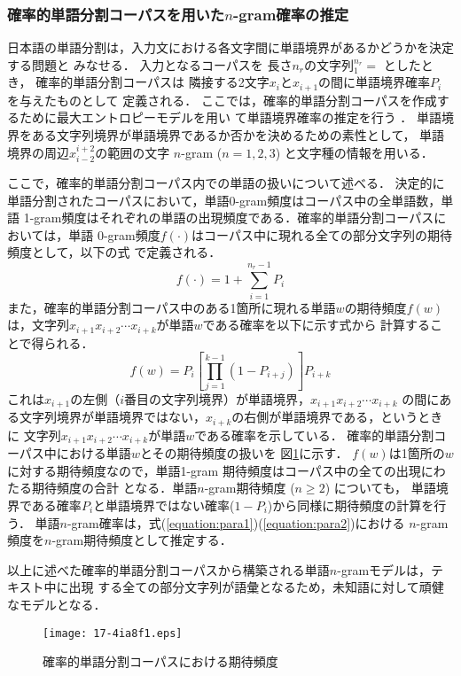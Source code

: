 \documentclass[japanese]{jnlp_1.4}
\def\Bdma#1{}
\def\Conc#1#2{}
\begin{document}
\subsubsection{確率的単語分割コーパスを用いた$n$-gram確率の推定}
\label{subsubsect:WBP}

日本語の単語分割は，入力文における各文字間に単語境界があるかどうかを決定する問題と
みなせる．
入力となるコーパスを
長さ$n_r$の文字列$\Bdma{x}_1^{n_r} = \Conc{x}{n_r}$
としたとき，
確率的単語分割コーパスは
隣接する2文字$x_{i}$と$x_{i+1}$の間に単語境界確率$P_{i}$を与えたものとして
定義される．
ここでは，確率的単語分割コーパスを作成するために最大エントロピーモデルを用い
て単語境界確率の推定を行う
\cite{擬似確率的単語分割コーパスによる言語モデルの改良}．
単語境界をある文字列境界が単語境界であるか否かを決めるための素性として，
単語境界の周辺$x_{i-2}^{i+2}$の範囲の文字
$n$-gram ($n = 1, 2, 3$) と文字種の情報を用いる．

ここで，確率的単語分割コーパス内での単語の扱いについて述べる．
決定的に単語分割されたコーパスにおいて，単語0-gram頻度はコーパス中の全単語数，単語
1-gram頻度はそれぞれの単語の出現頻度である．確率的単語分割コーパスにおいては，単語
0-gram頻度$f(\cdot)$はコーパス中に現れる全ての部分文字列の期待頻度として，以下の式
で定義される．
\[
 f(\cdot) = 1 + \sum_{i=1}^{n_{r}-1} P_{i}
\]
また，確率的単語分割コーパス中のある1箇所に現れる単語$w$の期待頻度$f(w)$
は，文字列$x_{i+1} x_{i+2}\cdots x_{i+k}$が単語$w$である確率を以下に示す式から
計算することで得られる．
\[
     f(w) = 
     P_{i}\left[\prod_{j=1}^{k-1} (1-P_{i+j})\right]
     P_{i+k}
\]
これは$x_{i+1}$の左側（$i$番目の文字列境界）が単語境界，$x_{i+1} x_{i+2}\cdots x_{i+k}$
の間にある文字列境界が単語境界ではない，$x_{i+k}$の右側が単語境界である，というときに
文字列$x_{i+1} x_{i+2}\cdots x_{i+k}$が単語$w$である確率を示している．
確率的単語分割コーパス中における単語$w$とその期待頻度の扱いを
図\ref{figure_sect2_SSC_freq}に示す．
$f(w)$は1箇所の$w$に対する期待頻度なので，単語1-gram
期待頻度はコーパス中の全ての出現にわたる期待頻度の合計
となる．単語$n$-gram期待頻度 ($n\geq 2$) についても，
単語境界である確率$P_i$と単語境界ではない確率($1-P_i$)から同様に期待頻度の計算を行う．
単語$n$-gram確率は，式(\ref{equation:para1})(\ref{equation:para2})における
$n$-gram頻度を$n$-gram期待頻度として推定する．

以上に述べた確率的単語分割コーパスから構築される単語$n$-gramモデルは，テキスト中に出現
する全ての部分文字列が語彙となるため，未知語に対して頑健なモデルとなる．

\begin{figure}[t]
  \begin{center}
\texttt{[image: 17-4ia8f1.eps]}
  \end{center}
  \caption{確率的単語分割コーパスにおける期待頻度}
  \label{figure_sect2_SSC_freq}
\end{figure}
\end{document}
